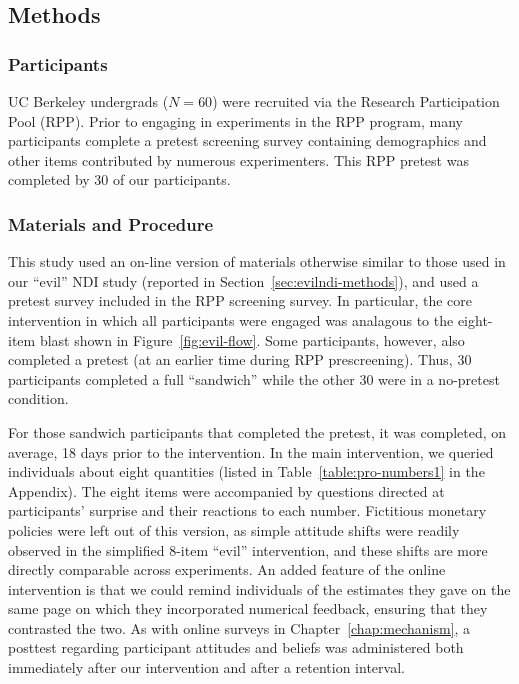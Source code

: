 \subsection{Methods}

\subsubsection{Participants}

UC Berkeley undergrads ($N=60$) were recruited via the Research Participation
Pool (RPP). Prior to engaging in experiments in the RPP program, many
participants complete a pretest screening survey containing demographics and
other items contributed by numerous experimenters. This RPP pretest was
completed by 30 of our participants. 

\subsubsection{Materials and Procedure}

This study used an on-line version of materials otherwise similar to those used
in our “evil” NDI study (reported in Section~\ref{sec:evilndi-methods}), and
used a pretest survey included in the RPP screening survey. In particular, the
core intervention in which all participants were engaged was analagous to the
eight-item blast shown in Figure~\ref{fig:evil-flow}. Some participants,
however, also completed a pretest (at an earlier time during RPP prescreening).
Thus, 30 participants completed a full “sandwich” while the other 30 were in a
no-pretest condition. 

For those sandwich participants that completed the pretest, it was completed, on
average, 18 days prior to the intervention. In the main intervention, we queried
individuals about eight quantities (listed in Table~\ref{table:pro-numbers1} in
the Appendix). The eight items were accompanied by questions directed at
participants’ surprise and their reactions to each number.  Fictitious monetary
policies were left out of this version, as simple attitude shifts were readily
observed in the simplified 8-item “evil” intervention, and these shifts are more
directly comparable across experiments.  An added feature of the online
intervention is that we could remind individuals of the estimates they gave on
the same page on which they incorporated numerical feedback, ensuring that they
contrasted the two. As with online surveys in Chapter~\ref{chap:mechanism}, a
posttest regarding participant attitudes and beliefs was administered both
immediately after our intervention and after a retention interval.


